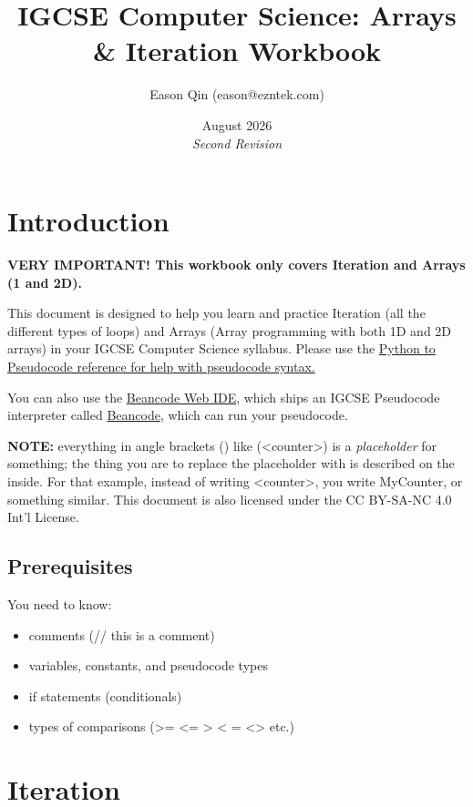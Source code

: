 \documentclass[a4paper, 11pt]{article}
\title{IGCSE Computer Science: Arrays \& Iteration Workbook}
\author{Eason Qin (eason@ezntek.com)}
\date{August 2026\\\emph{Second Revision}}
\begin{document}
\setlength{\arrayrulewidth}{0.3pt}

\maketitle

\section{Introduction}

{\Large \textbf{VERY IMPORTANT! This workbook only covers Iteration and Arrays (1 and 2D).}}

This document is designed to help you learn and practice Iteration (all the different types of loops) and Arrays (Array programming with both 1D and 2D arrays) in your IGCSE Computer Science syllabus. Please use the \href{https://ezntek.com/revision/pseudocode_reference.html}{Python to Pseudocode reference for help with pseudocode syntax.}

You can also use the \href{https://beancode-web.net}{Beancode Web IDE}, which ships an IGCSE Pseudocode interpreter called \href{https://github.com/ezntek/beancode}{Beancode}, which can run your pseudocode.

\textbf{NOTE:} everything in angle brackets ({\ccmono < >}) like ({\ccmono <counter>}) is a \emph{placeholder} for something; the thing you are to replace the placeholder with is described on the inside. For that example, instead of writing {\ccmono <counter>}, you write {\ccmono MyCounter}, or something similar. This document is also licensed under the CC BY-SA-NC 4.0 Int'l License.

\subsection{Prerequisites}

You need to know:

\begin{itemize}
    \item comments ({\ccmono // this is a comment})
    \item variables, constants, and pseudocode types
    \item if statements (conditionals)
    \item types of comparisons ({\ccmono >= <= > < = <>} etc.)
\end{itemize}

\newpage 
\section{Iteration}

\end{document}
